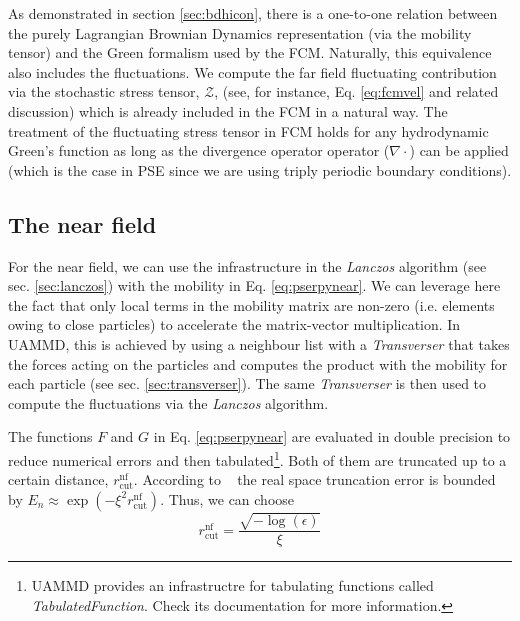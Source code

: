 \documentclass[twoside,openright,titlepage,numbers=noenddot,%
headinclude,footinclude,cleardoublepage=empty,abstract=on,
BCOR=5mm,fontsize=11pt, dvipsnames, paper=b5
]{scrreprt}
\newcommand{\uammd}{\gls{UAMMD}\xspace}
\begin{document}
As demonstrated in section \ref{sec:bdhicon}, there is a one-to-one relation between the purely Lagrangian Brownian Dynamics representation (via the mobility tensor) and the Green formalism used by the \gls{FCM}. Naturally, this equivalence also includes the fluctuations. We compute the far field fluctuating contribution via the stochastic stress tensor, $\mathcal{Z}$, (see, for instance, Eq. \eqref{eq:fcmvel} and related discussion) which is already included in the \gls{FCM} in a natural way. The treatment of the fluctuating stress tensor in \gls{FCM} holds for any hydrodynamic Green's function as long as the divergence operator operator ($\nabla\cdot$) can be applied (which is the case in \gls{PSE} since we are using triply periodic boundary conditions).
\subsection*{The near field}

For the near field, we can use the infrastructure in the \emph{Lanczos} algorithm (see sec. \ref{sec:lanczos}) with the mobility in Eq. \eqref{eq:pserpynear}. We can leverage here the fact that only local terms in the mobility matrix are non-zero (i.e. elements owing to close particles) to accelerate the matrix-vector multiplication. In \uammd, this is achieved by using a neighbour list with a \emph{Transverser} that takes the forces acting on the particles and computes the product with the mobility for each particle (see sec. \ref{sec:transverser}). The same \emph{Transverser} is then used to compute the fluctuations via the \emph{Lanczos} algorithm.

The functions $F$ and $G$ in Eq. \eqref{eq:pserpynear} are evaluated in double precision to reduce numerical errors and then tabulated\footnote{\uammd provides an infrastructre for tabulating functions called \emph{TabulatedFunction}. Check its documentation for more information.}. Both of them are truncated up to a certain distance, $r_{\textrm{cut}}^{\textrm{nf}}$. According to ~\cite{Lindbo2011} the real space truncation error is bounded by $E_n\approx \exp(-\xi^2r_{\textrm{cut}}^{\textrm{nf}})$. Thus, we can choose
\begin{equation}
r_{\textrm{cut}}^{\textrm{nf}} = \frac{\sqrt{-\log(\epsilon)}}{\xi}
\end{equation}
\end{document}
